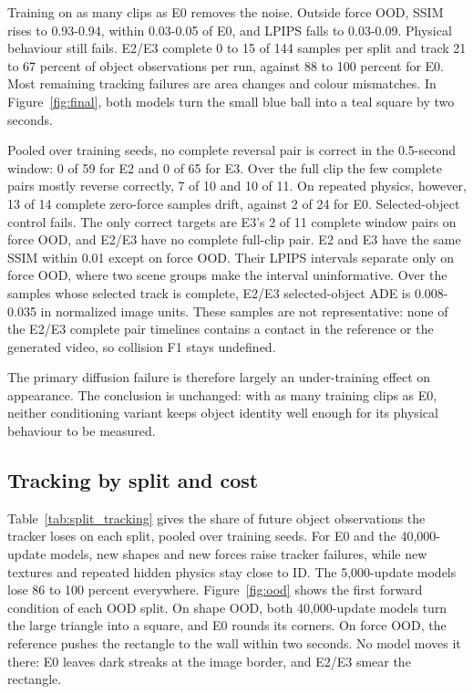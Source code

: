 \documentclass[11pt,a4paper]{article}
\begin{document}
Training on as many clips as E0 removes the noise. Outside force OOD, SSIM rises to 0.93-0.94, within 0.03-0.05 of E0, and LPIPS falls to 0.03-0.09. Physical behaviour still fails. E2/E3 complete 0 to 15 of 144 samples per split and track 21 to 67 percent of object observations per run, against 88 to 100 percent for E0. Most remaining tracking failures are area changes and colour mismatches. In Figure~\ref{fig:final}, both models turn the small blue ball into a teal square by two seconds.

Pooled over training seeds, no complete reversal pair is correct in the 0.5-second window: 0 of 59 for E2 and 0 of 65 for E3. Over the full clip the few complete pairs mostly reverse correctly, 7 of 10 and 10 of 11. On repeated physics, however, 13 of 14 complete zero-force samples drift, against 2 of 24 for E0. Selected-object control fails. The only correct targets are E3's 2 of 11 complete window pairs on force OOD, and E2/E3 have no complete full-clip pair. E2 and E3 have the same SSIM within 0.01 except on force OOD. Their LPIPS intervals separate only on force OOD, where two scene groups make the interval uninformative. Over the samples whose selected track is complete, E2/E3 selected-object ADE is 0.008-0.035 in normalized image units. These samples are not representative: none of the E2/E3 complete pair timelines contains a contact in the reference or the generated video, so collision F1 stays undefined.

The primary diffusion failure is therefore largely an under-training effect on appearance. The conclusion is unchanged: with as many training clips as E0, neither conditioning variant keeps object identity well enough for its physical behaviour to be measured.

\subsection{Tracking by split and cost}
\label{sec:cost}
Table~\ref{tab:split_tracking} gives the share of future object observations the tracker loses on each split, pooled over training seeds. For E0 and the 40,000-update models, new shapes and new forces raise tracker failures, while new textures and repeated hidden physics stay close to ID. The 5,000-update models lose 86 to 100 percent everywhere. Figure~\ref{fig:ood} shows the first forward condition of each OOD split. On shape OOD, both 40,000-update models turn the large triangle into a square, and E0 rounds its corners. On force OOD, the reference pushes the rectangle to the wall within two seconds. No model moves it there: E0 leaves dark streaks at the image border, and E2/E3 smear the rectangle.
\end{document}
